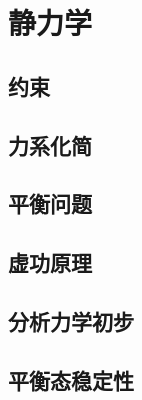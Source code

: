 \chapter{静力学}

\section{约束}

\section{力系化简}

\section{平衡问题}

\section{虚功原理}

\section{分析力学初步}

\section{平衡态稳定性}
